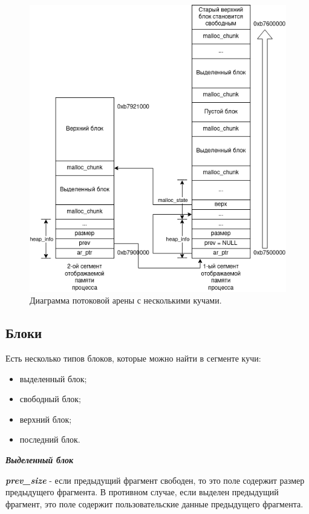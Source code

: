 \begin{figure}[!h]
	\begin{center}
		\includegraphics[scale=0.6]{images/glibc-malloc-thread-arena-multi.png}
		\caption{Диаграмма потоковой арены с несколькими кучами.}
		\label{glibc-malloc-thread-arena-multi}
	\end{center}
\end{figure}

\subsection{Блоки}
Есть несколько типов блоков, которые можно найти в сегменте кучи:
\begin{itemize}
	\item выделенный блок;
	\item свободный блок;
	\item верхний блок;
	\item последний блок.
\end{itemize}

\bigbreak
\textbf{\textit{Выделенный блок}}

\textit{\textbf{prev\_size}} - если предыдущий фрагмент свободен, то это поле содержит размер предыдущего фрагмента. В противном случае, если выделен предыдущий фрагмент, это поле содержит пользовательские данные предыдущего фрагмента.

